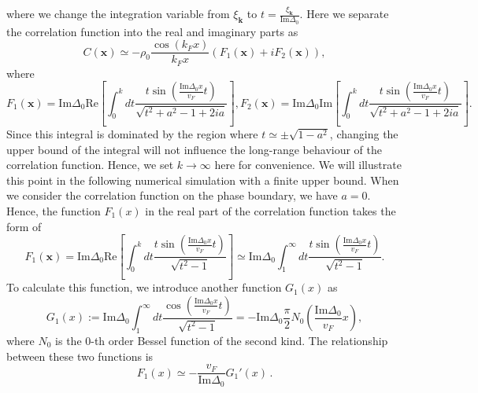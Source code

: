 \documentclass[aps,prl,twocolumn,nofootinbib,superscriptaddress,longbibliography]{revtex4-1}
\begin{document}
where we change the integration variable from $\xi_{\bm{k}}$ to $t=\frac{\xi_{\bm{k}}}{\text{Im}\Delta_0} $. Here we separate the correlation function into the real and imaginary parts as 
\begin{equation}
	C(\bm{x})\simeq-\rho_0 \frac{\cos(k_F x)}{k_Fx}(F_1(\bm{x})+iF_2(\bm{x})),
\end{equation}
where
\begin{equation}
	F_1(\bm{x})=\text{Im}\Delta_0\text{Re}\left[\int_0^{k} dt \frac{t\sin ( \frac{\text{Im}\Delta_0x}{v_F}
	t )}{ \sqrt{t^2 +a^2- 1+2ia}}\right],F_2(\bm{x})=\text{Im}\Delta_0\text{Im}\left[\int_0^{k} dt \frac{t\sin ( \frac{\text{Im}\Delta_0x}{v_F}
	t )}{ \sqrt{t^2 +a^2- 1+2ia}}\right]\label{F_1F_2}.
\end{equation}
 Since this integral is dominated by the region where $t\simeq\pm\sqrt{1-a^2}$, changing the upper bound of the integral will not influence the long-range behaviour of the correlation function. Hence, we set $k\to\infty$ here for convenience. We will illustrate this point in the following numerical simulation with a finite upper bound.
 When we consider the correlation function on the phase boundary, we have $a=0$. Hence, the function $F_1(x)$ in the real part of the correlation function takes the form of
\begin{equation}
	F_1(\bm{x})=\text{Im}\Delta_0\text{Re}\left[\int_0^{k} dt \frac{t\sin ( \frac{\text{Im}\Delta_0x}{v_F}
	t )}{ \sqrt{t^2 - 1}}\right]\simeq\text{Im}\Delta_0\int_1^{\infty} dt \frac{t\sin ( \frac{\text{Im}\Delta_0x}{v_F}
	t )}{ \sqrt{t^2 - 1}}.
	\label{definition_of_F1}
\end{equation}
To calculate this function, we introduce another function $G_1(x)$ as
\begin{equation}
	G_1 (x) := \text{Im}
		\Delta_0\int_1^{\infty} dt \frac{\cos ( \frac{\text{Im}\Delta_0x}{v_F}
		t )}{ \sqrt{t^2 - 1}}=-\text{Im}\Delta_0\frac{\pi}{2} N_0 \left( \frac{\text{Im} \Delta_0}{v_F} x \right),
\end{equation}
where $N_0$ is the 0-th order Bessel function of the second kind. The relationship between these two functions is 
\begin{equation}
	F_1 (x) \simeq - \frac{v_F}{\text{Im}\Delta_0} G_1' (x)\,.
\end{equation}
\end{document}

